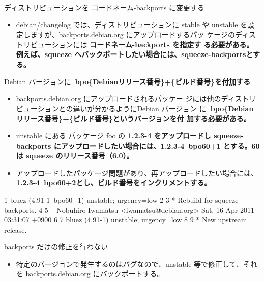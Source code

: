 \begin{frame}[containsverbatim]{ディストリビューションを コードネーム-backports に変更する}

\begin{itemize}
\item debian/changelog では、ディストリビューションに stable 
や unstable を設定しますが、backports.debian.org にアップロードするパッ
ケージのディストリビューションには \bf{コードネーム-backports} を指定す
      る必要がある。
例えば、squeeze へバックポートしたい場合には、\bf{squeeze-backports}とす
      る。
\end{itemize}

\end{frame}


\begin{frame}[containsverbatim]{Debian バージョンに\bf{~{}bpo\{Debianリリース番号\}+\{ビルド番号\}}を付加する}

\begin{itemize}
\item backports.debian.org にアップロードされるパッケー
ジには他のディストリビューションとの違いが分かるようにDebian バージョン
に\bf{~{}bpo\{Debianリリース番号\}+\{ビルド番号\}}というバージョンを付
加する必要がある。
\item unstable にある パッケージ foo の \bf{1.2.3-4} をアップロードし
squeeze-backports にアップロードしたい場合には、\bf{1.2.3-4~{}bpo60+1}
とする。60は squeeze のリリース番号（6.0）。
\item アップロードしたパッケージ問題があり、再アップロードしたい場合には、
\bf{1.2.3-4~{}bpo60+2}とし、ビルド番号をインクリメントする。
\end{itemize}

\end{frame}

\begin{frame}[containsverbatim]
\begin{commandline}
  1 bluez (4.91-1~bpo60+1) unstable; urgency=low
  2 
  3   * Rebuild for squeeze-backports.
  4 
  5  -- Nobuhiro Iwamatsu <iwamatsu@debian.org>  Sat, 16 Apr 2011 03:31:07 +0900
  6 
  7 bluez (4.91-1) unstable; urgency=low
  8 
  9   * New upstream release.
\end{commandline}

\end{frame}



\begin{frame}[containsverbatim]{backports だけの修正を行わない}
\begin{itemize}
\item 特定のバージョンで発生するのはバグなので、unstable 等で修正して、それを
backports.debian.org にバックポートする。
\end{itemize}

\end{frame}


